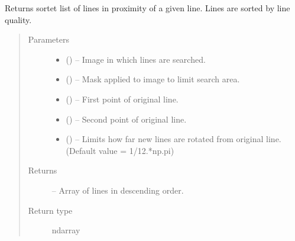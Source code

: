 \documentclass[letterpaper,10pt,english]{sphinxmanual}
\begin{document}
\begin{fulllineitems}
\label{\detokenize{image_lines:image_lines.get_weighted_lines}}
Returns sortet list of lines in proximity of a given line.
Lines are sorted by line quality.
\begin{quote}\begin{description}
\item[{Parameters}] \leavevmode\begin{itemize}
\item {} 
 () -- Image in which lines are searched.

\item {} 
 () -- Mask applied to image to limit search area.

\item {} 
 () -- First point of original line.

\item {} 
 () -- Second point of original line.

\item {} 
 () -- Limits how far new lines are rotated from original line.
(Default value = 1/12.*np.pi)

\end{itemize}

\item[{Returns}] \leavevmode
{} -- Array of lines in descending order.

\item[{Return type}] \leavevmode
ndarray

\end{description}\end{quote}

\end{fulllineitems}

\end{document}
